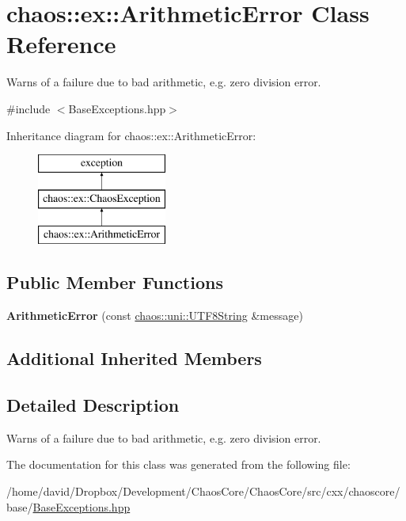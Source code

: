 \hypertarget{classchaos_1_1ex_1_1_arithmetic_error}{\section{chaos\-:\-:ex\-:\-:Arithmetic\-Error Class Reference}
\label{classchaos_1_1ex_1_1_arithmetic_error}
}


Warns of a failure due to bad arithmetic, e.\-g. zero division error.  




{\ttfamily \#include $<$Base\-Exceptions.\-hpp$>$}

Inheritance diagram for chaos\-:\-:ex\-:\-:Arithmetic\-Error\-:\begin{figure}[H]
\begin{center}
\leavevmode
\includegraphics[height=3.000000cm]{classchaos_1_1ex_1_1_arithmetic_error}
\end{center}
\end{figure}
\subsection*{Public Member Functions}
\begin{DoxyCompactItemize}
\item 
\hypertarget{classchaos_1_1ex_1_1_arithmetic_error_a463d7850575f70f3d34d9db3300df29e}{{\bfseries Arithmetic\-Error} (const \hyperlink{classchaos_1_1uni_1_1_u_t_f8_string}{chaos\-::uni\-::\-U\-T\-F8\-String} \&message)}\label{classchaos_1_1ex_1_1_arithmetic_error_a463d7850575f70f3d34d9db3300df29e}

\end{DoxyCompactItemize}
\subsection*{Additional Inherited Members}


\subsection{Detailed Description}
Warns of a failure due to bad arithmetic, e.\-g. zero division error. 

The documentation for this class was generated from the following file\-:\begin{DoxyCompactItemize}
\item 
/home/david/\-Dropbox/\-Development/\-Chaos\-Core/\-Chaos\-Core/src/cxx/chaoscore/base/\hyperlink{_base_exceptions_8hpp}{Base\-Exceptions.\-hpp}\end{DoxyCompactItemize}
